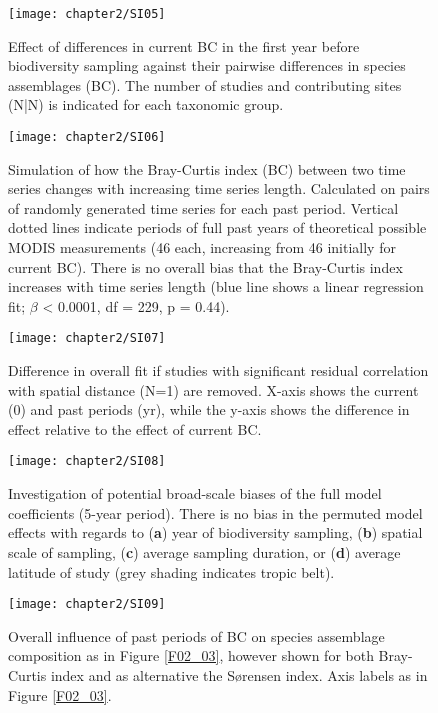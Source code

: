 \begin{figure}[h]
\centering
\texttt{[image: chapter2/SI05]}
\caption{ Effect of differences in current BC in the first year before biodiversity sampling against their pairwise differences in species assemblages (BC). The number of studies and contributing sites (N|N) is indicated for each taxonomic group. }
\label{SI02_05}
\end{figure}

\begin{figure}[h]
\centering
\texttt{[image: chapter2/SI06]}
\caption{ Simulation of how the Bray-Curtis index (BC) between two time series changes with increasing time series length. Calculated on pairs of randomly generated time series for each past period. Vertical dotted lines indicate periods of full past years of theoretical possible MODIS measurements (46 each, increasing from 46 initially for current BC). There is no overall bias that the Bray-Curtis index increases with time series length (blue line shows a linear regression fit; $\beta$ < 0.0001, df = 229, p = 0.44).}
\label{SI02_06}
\end{figure}

\begin{figure}[h]
\centering
\texttt{[image: chapter2/SI07]}
\caption{ Difference in overall fit if studies with significant residual correlation with spatial distance (N=1) are removed. X-axis shows the current (0) and past periods (yr), while the y-axis shows the difference in effect relative to the effect of current BC.}
\label{SI02_07}
\end{figure}

\begin{figure}[h]
\centering
\texttt{[image: chapter2/SI08]}
\caption{ Investigation of potential broad-scale biases of the full model coefficients (5-year period). There is no bias in the permuted model effects with regards to (\textbf{a}) year of biodiversity sampling, (\textbf{b}) spatial scale of sampling, (\textbf{c}) average sampling duration, or (\textbf{d}) average latitude of study (grey shading indicates tropic belt).}
\label{SI02_08}
\end{figure}

\begin{figure}[h]
\centering
\texttt{[image: chapter2/SI09]}
\caption{ Overall influence of past periods of BC on species assemblage composition as in Figure \ref{F02_03}, however shown for both Bray-Curtis index and as alternative the S\o rensen index. Axis labels as in Figure \ref{F02_03}.}
\label{SI02_09}
\end{figure}

